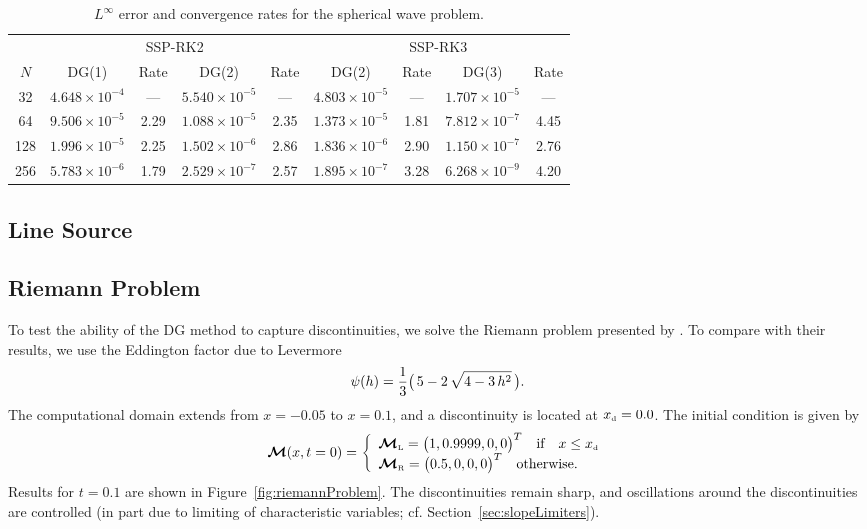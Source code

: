 \documentclass[10pt,preprint]{aastex}
\begin{document}
\begin{table}
  \begin{center}
  \caption{$L^{\infty}$ error and convergence rates for the spherical wave problem.}
  \begin{tabular}{ccccccccc}
    & \multicolumn{4}{c}{SSP-RK2} & \multicolumn{4}{c}{SSP-RK3} \\
    \cmidrule(r){2-5} \cmidrule(r){6-9}
    $N$ & DG(1) & Rate & DG(2) & Rate & DG(2) & Rate & DG(3) & Rate \\
    \midrule \midrule
    32   & $4.648\times10^{-4}$ & ---  & $5.540\times10^{-5}$ & ---   & $4.803\times10^{-5}$ & ---  & $1.707\times10^{-5}$ & --- \\
    64   & $9.506\times10^{-5}$ &2.29& $1.088\times10^{-5}$ &2.35& $1.373\times10^{-5}$ &1.81& $7.812\times10^{-7}$ &4.45 \\
    128 & $1.996\times10^{-5}$ &2.25& $1.502\times10^{-6}$ &2.86& $1.836\times10^{-6}$ &2.90& $1.150\times10^{-7}$ &2.76 \\
    256 & $5.783\times10^{-6}$ &1.79& $2.529\times10^{-7}$ &2.57& $1.895\times10^{-7}$ &3.28& $6.268\times10^{-9}$ &4.20 \\
    \midrule \midrule
  \end{tabular}
  \end{center}
\end{table}

\subsection{Line Source}

\subsection{Riemann Problem}

To test the ability of the DG method to capture discontinuities, we solve the Riemann problem presented by \citet{OHF2012}.  
To compare with their results, we use the Eddington factor due to Levermore \citep{levermore_1984}
\begin{equation}
  \psi(h)=\frac{1}{3}\big(\,5-2\,\sqrt{4-3\,h^{2}}\,\big).  
  \label{eq:eddingtonFactorLevermore}
\end{equation}
The computational domain extends from $x=-0.05$ to $x=0.1$, and a discontinuity is located at $x_{\mbox{\tiny d}}=0.0$.  
The initial condition is given by
\begin{equation}
  \boldsymbol{\mathcal{M}}(x,t=0)=
  \left\{
  \begin{array}{l}
  \boldsymbol{\mathcal{M}}_{\mbox{\tiny L}}=\big(1,0.9999,0,0\big)^{T} \quad\text{if}\quad x\le x_{\mbox{\tiny d}} \\
  \boldsymbol{\mathcal{M}}_{\mbox{\tiny R}}=\big(0.5,0,0,0\big)^{T} \quad\text{otherwise}.
  \end{array}
  \right.
  \label{eq:riemannProblem}
\end{equation}
Results for $t=0.1$ are shown in Figure~\ref{fig:riemannProblem}.  
The discontinuities remain sharp, and oscillations around the discontinuities are controlled (in part due to limiting of characteristic variables; cf. Section~\ref{sec:slopeLimiters}).  
\end{document}
